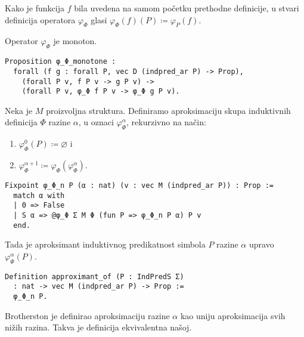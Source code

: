 \begin{remark}
  Kako je funkcija \(f\) bila uvedena na samom početku prethodne definicije,
  u stvari definicija operatora \(\varphi_{\Phi}\) glasi
  \(
    \varphi_{\Phi}(f)(P) \coloneq \varphi_{P}(f)
  \).
\end{remark}


\begin{proposition}
  Operator \(\varphi_{\Phi}\) je monoton.
\begin{verbatim}
Proposition φ_Φ_monotone :
  forall (f g : forall P, vec D (indpred_ar P) -> Prop),
    (forall P v, f P v -> g P v) ->
    (forall P v, φ_Φ f P v -> φ_Φ g P v).
\end{verbatim}
\end{proposition}

\begin{definition}[Aproksimanti]
  Neka je \(M\) proizvoljna struktura.
  Definiramo aproksimaciju skupa induktivnih definicija \(\Phi\) razine \(\alpha\), u oznaci \(\varphi_{\Phi}^{\alpha}\), rekurzivno na način:
  \begin{enumerate}
  \item \( \varphi_{\Phi}^{0}(P) \coloneq \varnothing \) i
  \item \( \varphi_{\Phi}^{\alpha + 1} \coloneq \varphi_{\Phi}(\varphi_{\Phi}^{\alpha}) \).
  \end{enumerate}
\begin{verbatim}
Fixpoint φ_Φ_n P (α : nat) (v : vec M (indpred_ar P)) : Prop :=
  match α with
  | 0 => False
  | S α => @φ_Φ Σ M Φ (fun P => φ_Φ_n P α) P v
  end.
\end{verbatim}
  \noindent Tada je aproksimant induktivnog predikatnost simbola \(P\) razine \(\alpha\) upravo \(\varphi_{\Phi}^{\alpha}(P)\).
\begin{verbatim}
Definition approximant_of (P : IndPredS Σ)
  : nat -> vec M (indpred_ar P) -> Prop :=
  φ_Φ_n P.
\end{verbatim}
\end{definition}


\begin{remark}
  Brotherston je definirao aproksimaciju razine \(\alpha\) kao uniju aproksimacija svih nižih razina.
  Takva je definicija ekvivalentna našoj.
\end{remark}

